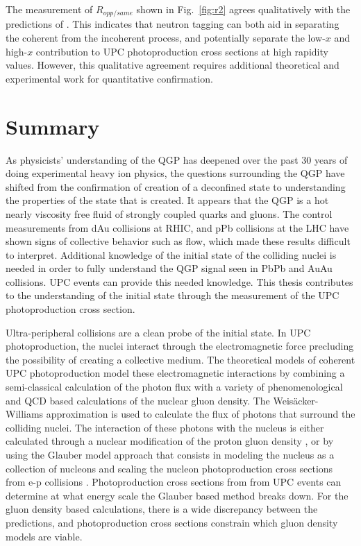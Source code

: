     The measurement of $R_{opp/same}$ shown in Fig.~\ref{fig:r2} agrees 
      qualitatively with the predictions of \cite{Guzey:2013jaa}.
    This indicates that neutron tagging can both aid in separating the coherent
      from the incoherent process, and potentially separate the low-$x$ and 
      high-$x$ contribution to UPC photoproduction cross sections at high 
      rapidity values. 
    However, this qualitative agreement requires additional theoretical and 
      experimental work for quantitative confirmation. 

  \section{\label{sec:summary}Summary}
    As physicists' understanding of the QGP has deepened over the past 30 years
      of doing experimental heavy ion physics, the questions surrounding the
      QGP have shifted from the confirmation of creation of a deconfined state
      to understanding the properties of the state that is created.
    It appears that the QGP is a hot nearly viscosity free fluid of strongly 
      coupled quarks and gluons. 
    The control measurements from dAu collisions at RHIC, and pPb collisions
      at the LHC have shown signs of collective behavior such as flow, which 
      made these results difficult to interpret.
    Additional knowledge of the initial state of the colliding nuclei is needed
      in order to fully understand the QGP signal seen in PbPb and AuAu 
      collisions.
    UPC events can provide this needed knowledge. 
    This thesis contributes to the understanding of the initial state through
      the measurement of the UPC \JPsi{} photoproduction cross section. 
  
    Ultra-peripheral collisions are a clean probe of the initial state. 
    In UPC \JPsi{} photoproduction, the nuclei interact through the 
      electromagnetic force precluding the possibility of creating a collective
      medium.
    The theoretical models of coherent UPC \JPsi{} photoproduction model these 
      electromagnetic interactions by combining a semi-classical calculation 
      of the photon flux with a variety of phenomenological and QCD based 
      calculations of the nuclear gluon density. 
    The Weis\"{a}cker-Williams approximation \cite{WWFermi} is used to calculate 
      the flux of photons that surround the colliding nuclei. 
    The interaction of these photons with the nucleus is either calculated 
      through a nuclear modification of the proton gluon density 
      \cite{pQCD2013.02, lta2012.03}, or by using the Glauber model approach 
      that consists in modeling the nucleus as a collection
      of nucleons and scaling the nucleon photoproduction cross sections from 
      e-p collisions \cite{vmd1999}. 
    Photoproduction cross sections from from UPC events can determine at what 
      energy scale the Glauber based method breaks down.
    For the gluon density based calculations, there is a wide discrepancy
      between the predictions, and photoproduction cross sections constrain which
      gluon density models are viable. 
  
